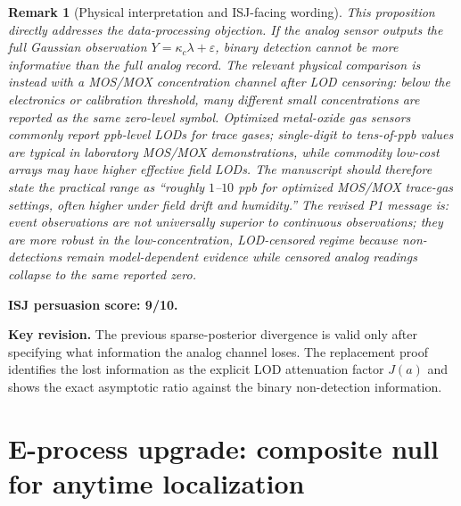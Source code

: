 \documentclass[11pt]{article}
\newtheorem{remark}[theorem]{Remark}
\begin{document}
\begin{remark}[Physical interpretation and ISJ-facing wording]\label{rem:p1-physical-lod}
This proposition directly addresses the data-processing objection.  If the analog sensor outputs the full Gaussian observation $Y=\kappa_c\lambda+\varepsilon$, binary detection cannot be more informative than the full analog record.  The relevant physical comparison is instead with a MOS/MOX concentration channel after LOD censoring: below the electronics or calibration threshold, many different small concentrations are reported as the same zero-level symbol.  Optimized metal-oxide gas sensors commonly report ppb-level LODs for trace gases; single-digit to tens-of-ppb values are typical in laboratory MOS/MOX demonstrations, while commodity low-cost arrays may have higher effective field LODs.  The manuscript should therefore state the practical range as ``roughly $1$--$10$ ppb for optimized MOS/MOX trace-gas settings, often higher under field drift and humidity.''  The revised P1 message is: event observations are not universally superior to continuous observations; they are more robust in the low-concentration, LOD-censored regime because non-detections remain model-dependent evidence while censored analog readings collapse to the same reported zero.
\end{remark}

\noindent\textbf{ISJ persuasion score: 9/10.}

\noindent\textbf{Key revision.}
The previous sparse-posterior divergence is valid only after specifying what information the analog channel loses.  The replacement proof identifies the lost information as the explicit LOD attenuation factor $J(a)$ and shows the exact asymptotic ratio against the binary non-detection information.

\section{E-process upgrade: composite null for anytime localization}
\end{document}
